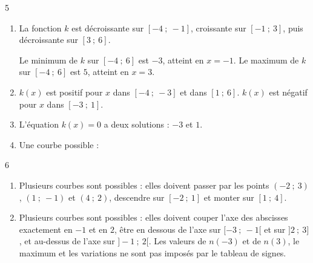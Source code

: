\documentclass[10pt,a4paper]{article}
\begin{document}
\begin{corr}{5}
\begin{enumerate}[leftmargin=*]
    \item La fonction \(k\) est décroissante sur \([-4\ ;\ -1]\), croissante sur \([-1\ ;\ 3]\), puis décroissante sur \([3\ ;\ 6]\).

    Le minimum de \(k\) sur \([-4\ ;\ 6]\) est \(-3\), atteint en \(x=-1\). Le maximum de \(k\) sur \([-4\ ;\ 6]\) est \(5\), atteint en \(x=3\).
    \item \(k(x)\) est positif pour \(x\) dans \([-4\ ;\ -3]\) et dans \([1\ ;\ 6]\). \(k(x)\) est négatif pour \(x\) dans \([-3\ ;\ 1]\).
    \item L'équation \(k(x)=0\) a deux solutions : \(-3\) et \(1\).
    \item Une courbe possible :
    \begin{center}
    \end{center}
\end{enumerate}
\end{corr}

\begin{corr}{6}
\begin{enumerate}[leftmargin=*]
    \item Plusieurs courbes sont possibles : elles doivent passer par les points \((-2\ ;\ 3)\), \((1\ ;\ -1)\) et \((4\ ;\ 2)\), descendre sur \([-2\ ;\ 1]\) et monter sur \([1\ ;\ 4]\).
    \item Plusieurs courbes sont possibles : elles doivent couper l'axe des abscisses exactement en \(-1\) et en \(2\), être en dessous de l'axe sur \([-3\ ;\ -1[\) et sur \(]2\ ;\ 3]\), et au-dessus de l'axe sur \(]-1\ ;\ 2[\). Les valeurs de \(n(-3)\) et de \(n(3)\), le maximum et les variations ne sont pas imposés par le tableau de signes.
\end{enumerate}
\end{corr}

\end{document}
